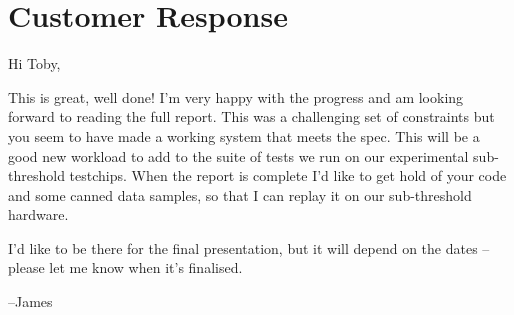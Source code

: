 \chapter{Customer Response}\label{app:customer}



Hi Toby,

This is great, well done! I'm very happy with the progress and am looking forward to reading the full report. This was a challenging set of constraints but you seem to have made a working system that meets the spec. This will be a good new workload to add to the suite of tests we run on our experimental sub-threshold testchips. When the report is complete I'd like to get hold of your code and some canned data samples, so that I can replay it on our sub-threshold hardware.

I'd like to be there for the final presentation, but it will depend on the dates – please let me know when it's finalised.

--James